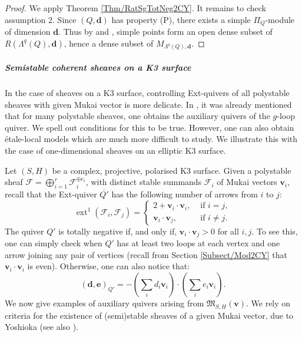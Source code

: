 \documentclass[11pt,english]{article}
\numberwithin{equation}{section}
\numberwithin{figure}{section}
\theoremstyle{definition}
\theoremstyle{plain}
\theoremstyle{remark}
\DeclareMathOperator{\ext}{ext}
\newcommand\dd{\mathbf{d}}
\newcommand\ee{\mathbf{e}}
\begin{document}
\begin{proof}

We apply Theorem \ref{Thm/RatSgTotNeg2CY}. It remains to check assumption
2. Since $(Q,\dd)$ has property (P), there exists a simple $\Pi_{Q}$-module
of dimension $\dd$. Thus by \cite[Thm. 1.2.]{CB01} and \cite[Thm. 1.11.]{CBS06},
simple points form an open dense subset of $R(\Lambda^{q}(Q),\dd)$,
hence a dense subset of $M_{\Lambda^{q}(Q),\dd}$. \end{proof}

\subparagraph*{Semistable coherent sheaves on a K3 surface}

In the case of sheaves on a K3 surface, controlling Ext-quivers of
all polystable sheaves with given Mukai vector is more delicate. In
\cite{BZ19}, it was already mentioned that for many polystable sheaves,
one obtains the auxiliary quivers of the $g$-loop quiver. We spell
out conditions for this to be true. However, one can also obtain étale-local
models which are much more difficult to study. We illustrate this
with the case of one-dimensional sheaves on an elliptic K3 surface.

Let $(S,H)$ be a complex, projective, polarised K3 surface. Given
a polystable sheaf $\mathcal{F}=\bigoplus_{i=1}^{r}\mathcal{F}_{i}^{\oplus e_{i}}$,
with distinct stable summands $\mathcal{F}_{i}$ of Mukai vectors
$\textbf{v}_{i}$, recall that the Ext-quiver $\overline{Q'}$ has
the following number of arrows from $i$ to $j$:\[
\ext^1(\mathcal{F}_{i},\mathcal{F}_{j})=
\left\{
\begin{array}{ll}
2+\textbf{v}_{i}\cdot\textbf{v}_{i}, & \text{ if } i=j, \\
\textbf{v}_{i}\cdot\textbf{v}_{j}, & \text{ if } i\ne j.
\end{array}
\right.
\]The quiver $Q'$ is totally negative if, and only if, $\textbf{v}_{i}\cdot\textbf{v}_{j}>0$
for all $i,j$. To see this, one can simply check when $Q'$ has at
least two loops at each vertex and one arrow joining any pair of vertices
(recall from Section \ref{Subsect/Mod2CY} that $\textbf{v}_{i}\cdot\textbf{v}_{i}$
is even). Otherwise, one can also notice that:\[
(\dd,\ee)_{Q'}=-\left(\sum_i d_i\textbf{v}_{i}\right)\cdot\left(\sum_i e_i\textbf{v}_{i}\right).
\]We now give examples of auxiliary quivers arising from $\mathfrak{M}_{S,H}(\textbf{v})$.
We rely on criteria for the existence of (semi)stable sheaves of a
given Mukai vector, due to Yoshioka \cite[Thm. 8.1.]{Yos01} (see
also \cite[\S2.4.]{KLS06}).
\end{document}
